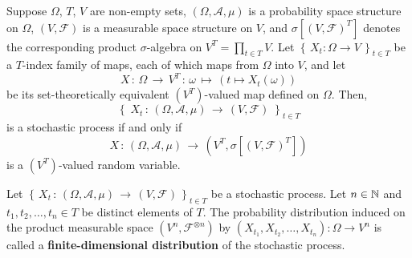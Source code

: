 \begin{corollary}
\mbox{}\vskip 0.1cm
\noindent
Suppose $\Omega$, $T$, $V$ are non-empty sets,
$\left(\Omega,\mathcal{A},\mu\right)$ is a probability space structure on $\Omega$,
$\left(V,\mathcal{F}\right)$ is a measurable space structure on $V$, and
$\sigma[(V,\mathcal{F})^{T}]$ denotes the corresponding product $\sigma$-algebra
on $V^{T} = \prod_{t\in T}V$.
Let $\left\{\,X_{t} : \Omega \longrightarrow V \,\right\}_{t \in T}$
be a $T$-index family of maps, each of which maps from $\Omega$ into $V$,
and let
\begin{equation*}
X \,:\, \Omega \,\longrightarrow\, V^{T} \,:\, \omega \,\longmapsto\, \left(t \longmapsto X_{t}(\omega)\right)
\end{equation*}
be its set-theoretically equivalent $(V^{T})$-valued map defined on $\Omega$.
Then,
\begin{equation*}
\left\{\; X_{t} \,:\, \left(\Omega,\mathcal{A},\mu\right)\,\longrightarrow\,\left(V,\mathcal{F}\right) \;\right\}_{t \in T}
\end{equation*}
is a stochastic process if and only if
\begin{equation*}
X \,:\, \left(\Omega,\mathcal{A},\mu\right)\,\longrightarrow\,\left(V^{T},\sigma[(V,\mathcal{F})^{T}]\right)
\end{equation*}
is a $(V^{T})$-valued random variable.
\end{corollary}

\begin{definition}
\mbox{}\vskip 0cm
\noindent
Let $\left\{\,X_{t}\,:\,(\Omega,\mathcal{A},\mu)\,\longrightarrow\,(V,\mathcal{F})\,\right\}_{t \in T}$
be a stochastic process.
Let $n \in \mathbb{N}$ and $t_{1},t_{2},\ldots,t_{n} \in T$ be distinct elements of $T$.
The probability distribution induced on the product measurable space
$\left(V^{n},\mathcal{F}^{\otimes n}\right)$
by $\left(X_{t_{1}},X_{t_{2}},\ldots,X_{t_{n}}\right):\Omega\longrightarrow V^{n}$
is called a \textbf{finite-dimensional distribution} of the stochastic process.
\end{definition}

